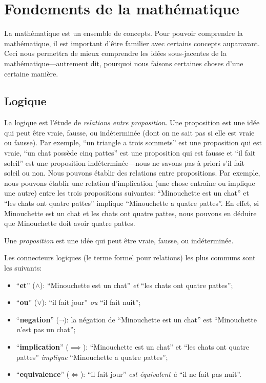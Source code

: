 \chapter{Fondements de la mathématique}

La mathématique est un ensemble de concepts. Pour pouvoir comprendre la mathématique, il est important d'être familier avec certains concepts auparavant. Ceci nous permettra de mieux comprendre les idées sous-jacentes de la mathématique---autrement dit, pourquoi nous faisons certaines choses d'une certaine manière.

\section{Logique}

La logique est l'étude de \textit{relations entre proposition}. Une proposition est une idée qui peut être vraie, fausse, ou indéterminée (dont on ne sait pas si elle est vraie ou fausse). Par exemple, ``un triangle a trois sommets'' est une proposition qui est vraie, ``un chat possède cinq pattes'' est une proposition qui est fausse et ``il fait soleil'' est une proposition indéterminée---nous ne savons pas à priori s'il fait soleil ou non. Nous pouvons établir des relations entre propositions. Par exemple, nous pouvons établir une relation d'implication (une chose entraîne ou implique une autre) entre les trois propositions suivantes: ``Minouchette est un chat'' et ``les chats ont quatre pattes'' implique ``Minouchette a quatre pattes''. En effet, si Minouchette est un chat et les chats ont quatre pattes, nous pouvons en déduire que Minouchette doit avoir quatre pattes.

\begin{definition}
    Une \emph{proposition} est une idée qui peut être vraie, fausse, ou indéterminée.
\end{definition}

Les connecteurs logiques (le terme formel pour relations) les plus communs sont les suivants:
\begin{itemize}
    \item ``\textbf{et}'' ($\wedge$): ``Minouchette est un chat'' \textit{et} ``les chats ont quatre pattes'';
    \item ``\textbf{ou}'' ($\vee$): ``il fait jour'' \textit{ou} ``il fait nuit'';
    \item ``\textbf{negation}'' ($\neg$): la négation de ``Minouchette est un chat'' est ``Minouchette \textit{n}'est pas un chat'';
    \item ``\textbf{implication}'' ($\implies$): ``Minouchette est un chat'' et ``les chats ont quatre pattes'' \textit{implique} ``Minouchette a quatre pattes'';
    \item ``\textbf{equivalence}'' ($\iff$): ``il fait jour'' \textit{est équivalent à} ``il ne fait pas nuit''.
\end{itemize}

